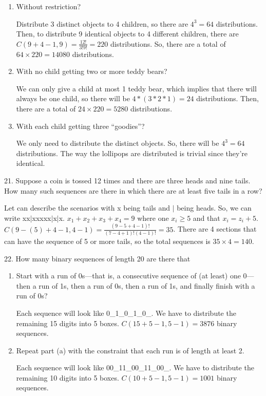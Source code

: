 \documentclass[12pt]{article}
\begin{document}
\begin{enumerate}[label=(\alph*)]
    \item Without restriction?
    \begin{solution}
        Distribute 3 distinct objects to 4 children, so there are 
        $4^3 = 64$ distributions. Then, to distribute 9 identical objects 
        to 4 different children, there are 
        $C(9+4-1, 9)=\frac{12!}{3!9!}=220$ 
        distributions. So, there are a total of $64\times220 = 14080$ 
        distributions.
    \end{solution}
    \item With no child getting two or more teddy bears?
    \begin{solution}
        We can only give a child at most 1 teddy bear, which implies 
        that there will always be one child, so there will be 
        $4*(3*2*1)=24$ distributions. Then, there are a total of 
        $24\times220=5280$ distributions.  
    \end{solution}
    \item With each child getting three “goodies”?
    \begin{solution}
        We only need to distribute the distinct objects. So, there 
        will be $4^3 = 64$ distributions. The way the lollipops are 
        distributed is trivial since they're identical. 
    \end{solution}
\end{enumerate}
21. Suppose a coin is tossed 12 times and there are three heads and nine 
tails. How many such sequences are there in which there are at least 
five tails in a row?
\begin{solution}
    Let can describe the scenarios with x being tails and $\vert$ being
    heads. So, we can write xx$\vert$xxxxx$\vert$x$\vert$x. 
    $x_1+x_2+x_3+x_4=9$ where one $x_i\ge5$ and that $x_i = z_i + 5$. 
    $C(9-(5)+4-1, 4-1) = \frac{(9-5+4-1)!}{(7-4+1)!(4-1)!} = 35$. There 
    are 4 sections that can have the sequence 
    of 5 or more tails, so the total sequences is $35\times4=140$. 
\end{solution}
22. How many binary sequences of length 20 are there that
\begin{enumerate}[label=(\alph*)]
    \item Start with a run of 0s—that is, a consecutive sequence of 
    (at least) one 0— then a run of 1s, then a run of 0s, then a run 
    of 1s, and finally finish with a run of 0s?
    \begin{solution}
        Each sequence will look like 0\_1\_0\_1\_0\_. We have to 
        distribute the remaining 15 digits into 5 boxes. 
        $C(15+5-1, 5-1)=3876$ binary sequences. 
    \end{solution}
    \item Repeat part (a) with the constraint that each run is of length 
    at least 2.
    \begin{solution}
        Each sequence will look like 00\_11\_00\_11\_00\_. We have to 
        distribute the remaining 10 digits into 5 boxes. 
        $C(10+5-1, 5-1) = 1001$ binary sequences. 
    \end{solution}
\end{enumerate}
\end{document}
